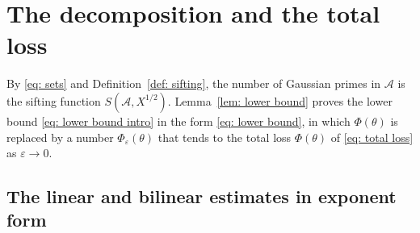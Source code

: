 \documentclass{article}
\numberwithin{equation}{section}
\begin{document}
\section{The decomposition and the total loss}
\label{sec: outline}

By \eqref{eq: sets} and Definition~\ref{def: sifting}, the number of Gaussian primes in $\mathcal{A}$ is the sifting function $S(\mathcal{A}, X^{1/2})$. Lemma~\ref{lem: lower bound} proves the lower bound \eqref{eq: lower bound intro} in the form \eqref{eq: lower bound}, in which $\Phi(\theta)$ is replaced by a number $\Phi_\varepsilon(\theta)$ that tends to the total loss $\Phi(\theta)$ of \eqref{eq: total loss} as $\varepsilon \to 0$.

\subsection{The linear and bilinear estimates in exponent form}
\label{subsec: exponent form}
\end{document}

